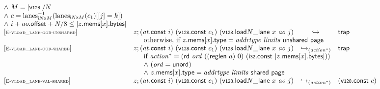 $$\begin{array}[t]{@{}lrcl@{}l@{}}
{\begin{array}[t]{@{}l@{}}
{\land}~ M = {|\mathsf{v{\scriptstyle 128}}|} / N \\
{\land}~ c = {{{{\mathrm{lanes}}}_{{{\mathsf{i}}{N}}{\mathsf{x}}{M}}^{{-1}}}}{({{\mathrm{lanes}}}_{{{\mathsf{i}}{N}}{\mathsf{x}}{M}}(c_1){}[{}[j] = k])} \\
{\land}~ i + {\mathit{ao}}{.}\mathsf{offset} + N / 8 \leq {|z{.}\mathsf{mems}{}[x]{.}\mathsf{bytes}|} \\
\end{array}
} \\
{[\textsc{\scriptsize E{-}vload\_lane{-}oob{-}unshared}]} \quad & z ; ({\mathit{at}}{.}\mathsf{const}~i)~(\mathsf{v{\scriptstyle 128}}{.}\mathsf{const}~c_1)~({\mathsf{v{\scriptstyle 128}}{.}\mathsf{load}}{N}{\mathsf{\_}}{\mathsf{lane}}~x~{\mathit{ao}}~j) & \hookrightarrow & \mathsf{trap} &  \\
& \multicolumn{4}{@{}l@{}}{\quad
\quad \mbox{otherwise, if}~ z{.}\mathsf{mems}{}[x]{.}\mathsf{type} = {\mathit{addrtype}}~{\mathit{limits}}~\mathsf{unshared}~\mathsf{page}
} \\
{[\textsc{\scriptsize E{-}vload\_lane{-}oob{-}shared}]} \quad & z ; ({\mathit{at}}{.}\mathsf{const}~i)~(\mathsf{v{\scriptstyle 128}}{.}\mathsf{const}~c_1)~({\mathsf{v{\scriptstyle 128}}{.}\mathsf{load}}{N}{\mathsf{\_}}{\mathsf{lane}}~x~{\mathit{ao}}~j) & {\hookrightarrow}_{({{\mathit{action}}^\ast})} {} & \mathsf{trap} &  \\
& \multicolumn{4}{@{}l@{}}{\quad
\quad
\begin{array}[t]{@{}l@{}}
\mbox{if}~ {{\mathit{action}}^\ast} = (\mathsf{rd}~{\mathit{ord}}~((\mathsf{reglen}~a)~0)~(\mathsf{i{\scriptstyle 32}}{.}\mathsf{const}~{|z{.}\mathsf{mems}{}[x]{.}\mathsf{bytes}|})) \\
{\land}~ ({\mathit{ord}} = \mathsf{unord}) \\
{\land}~ z{.}\mathsf{mems}{}[x]{.}\mathsf{type} = {\mathit{addrtype}}~{\mathit{limits}}~\mathsf{shared}~\mathsf{page} \\
\end{array}
} \\
{[\textsc{\scriptsize E{-}vload\_lane{-}val{-}shared}]} \quad & z ; ({\mathit{at}}{.}\mathsf{const}~i)~(\mathsf{v{\scriptstyle 128}}{.}\mathsf{const}~c_1)~({\mathsf{v{\scriptstyle 128}}{.}\mathsf{load}}{N}{\mathsf{\_}}{\mathsf{lane}}~x~{\mathit{ao}}~j) & {\hookrightarrow}_{({{\mathit{action}}^\ast})} {} & (\mathsf{v{\scriptstyle 128}}{.}\mathsf{const}~c) &  \\
& \multicolumn{4}{@{}l@{}}{\quad
\quad
\begin{array}[t]{@{}l@{}}

\end{array}}
\end{array}$$
